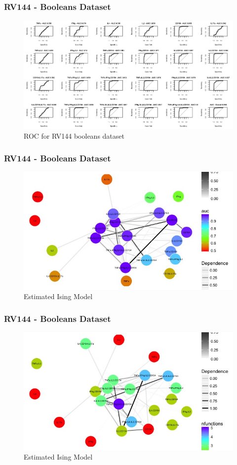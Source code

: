 \documentclass{beamer}
\theoremstyle{definition}
\begin{document}

\begin{frame}
\frametitle{RV144 - Booleans Dataset}
\begin{figure}[]
\includegraphics[width=12 cm]{figures/booleansAUC2} \caption{ROC for RV144 booleans dataset}
\end{figure}
\end{frame}


\begin{frame}
\frametitle{RV144 - Booleans Dataset}
\begin{figure}[]
\includegraphics[width=10 cm]{figures/booleansGraphAUC} \caption{Estimated Ising Model}
\end{figure}
\end{frame}


\begin{frame}
\frametitle{RV144 - Booleans Dataset}
\begin{figure}[]
\includegraphics[width=10 cm]{figures/booleansGraphFunctions} \caption{Estimated Ising Model}
\end{figure}
\end{frame}
\end{document}
